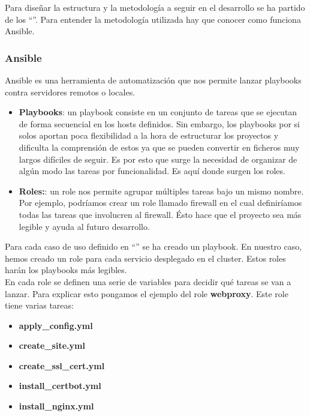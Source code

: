 \begin{text}
	Para diseñar la estructura y la metodología a seguir en el desarrollo se ha partido de los ``''. Para entender la metodología utilizada hay que conocer como funciona Ansible.
	
	\subsubsection{Ansible}
	\label{ansible_}
	\begin{text}
		Ansible es una herramienta de automatización que nos permite lanzar playbooks contra servidores remotos o locales.
		\begin{itemize}
			\item \textbf{Playbooks}: un playbook consiste en un conjunto de tareas que se ejecutan de forma secuencial en los hosts definidos. Sin embargo, los playbooks por si solos aportan poca flexibilidad a la hora de estructurar los proyectos y dificulta la comprensión de estos ya que se pueden convertir en ficheros muy largos difíciles de seguir. Es por esto que surge la necesidad de organizar de algún modo las tareas por funcionalidad. Es aquí donde surgen los roles.
			
			\item \textbf{Roles:}: un role nos permite agrupar múltiples tareas bajo un mismo nombre. Por ejemplo, podríamos crear un role llamado firewall en el cual definiríamos todas las tareas que involucren al firewall. Ésto hace que el proyecto sea más legible y ayuda al futuro desarrollo.
		\end{itemize}
	
	Para cada caso de uso definido en ``'' se ha creado un playbook. En nuestro caso, hemos creado un role para cada servicio desplegado en el cluster. Estos roles harán los playbooks más legibles. \\
	En cada role se definen una serie de variables para decidir qué tareas se van a lanzar. Para explicar esto pongamos el ejemplo del role \textbf{webproxy}. Este role tiene varias tareas:
	\begin{itemize}
		\item \textbf{apply\_config.yml}
		\item \textbf{create\_site.yml}
		\item \textbf{create\_ssl\_cert.yml}
		\item \textbf{install\_certbot.yml}
		\item \textbf{install\_nginx.yml}
	\end{itemize}


\end{text}
\end{text}
